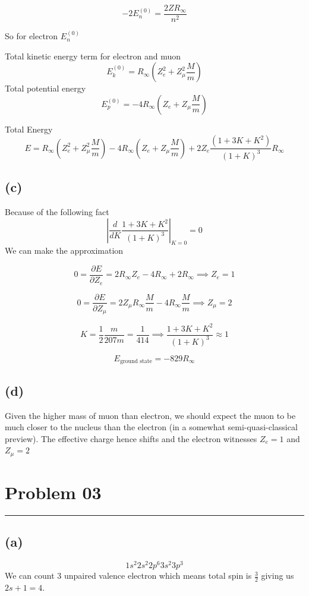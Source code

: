 \documentclass[letter, 10pts]{article}
\begin{document}
\[
  - 2 E_n ^{(0) } =  \frac{2 Z  R_\infty}{n^2}
\] 

So for electron $E_n ^{(0)}$ 


Total kinetic energy term for electron and muon 
\[
E_k^{(0)} = R_\infty \left(Z_e ^2 + Z_\mu ^2 \frac{M}{m}\right)
\] 
Total potential energy
\[
E_p^{(0)} = -
4 R_\infty \left(Z_e  + Z_\mu  \frac{M}{m}\right)
\] 

Total Energy 
\[ E = 
 R_\infty \left(Z_e ^2 + Z_\mu ^2 \frac{M}{m}\right)
 - 4 R_\infty \left(Z_e  + Z_\mu  \frac{M}{m}\right) 
 + 
 2 Z_e \frac{(1 + 3 K + K ^2 ) }{(1 + K)^
 3} R_\infty
\]

\subsection*{(c)} 


Because of the following fact
\[
\left|  
\frac{d}{d K} 
\frac{1 + 3 K + K^2}{(1 + K ) ^3 } \right|_{K = 0 }  = 0
\] 
We can make the approximation 

\[
0 = \frac{\partial E}{\partial Z_e} = 2 R_\infty Z_e - 4 R_\infty + 2 R_\infty \implies Z_e = 1 
\]

\[
0 = \frac{\partial E}{\partial Z_\mu} = 2 Z_\mu R_\infty \frac{M}{m} - 4 R_\infty \frac{M}{m} \implies Z_\mu = 2
\] 

\[
K = \frac{1}{2} \frac{m}{207 m} =\frac{1}{414} \implies \frac{1 + 3 K + K^2}{ (1 + K )^3 } \approx
1 \] 

\[
E_\text{ground state} = - 829 R_\infty
\] 


\subsection*{(d)} 
Given the higher mass of muon than electron, we should expect the muon to be much closer to the nucleus than the electron (in a somewhat semi-quasi-classical preview). The effective charge hence shifts and the electron witnesses $Z_e  = 1 $ and $Z_\mu = 2$






\section*{Problem 03}
\hrule 

\subsection*{(a)} 
\[
1s ^2 2s ^2 2 p ^{6} 3 s ^2 3 p ^3
\]
We can count $3$ unpaired valence electron which means total spin is $\frac{3}{2} $ giving us $2 s + 1 = 4$. 
\end{document}
